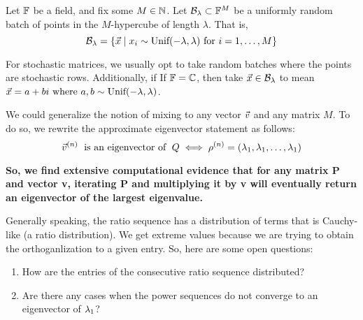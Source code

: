 \begin{definition}
Let $\F$ be a field, and fix some $M \in \N$. Let $\B_\lambda \subset \F^M$ be a uniformly random batch of points in the $M$-hypercube of length $\lambda$. That is,
$$\B_\lambda = \{\vec{x} \mid x_i \sim \text{Unif}(-\lambda, \lambda) \text{ for } i = \oneto[M]\}$$
\end{definition}

For stochastic matrices, we usually opt to take random batches where the points are stochastic rows.
Additionally, if If $\F = \mathbb{C}$, then take $\vec{x} \in \B_\lambda$ to mean $\vec{x} = a + bi \text{ where } a,b \sim \Unif(-\lambda,\lambda)$.


We could generalize the notion of mixing to any vector $\vvec$ and any matrix $M$.
To do so, we rewrite the approximate eigenvector statement as follows:
$$\vvecn{n} \text{\; is an eigenvector of \;} Q \iff \rvecn{n} = (\l_1, \l_1, \dots, \l_1)$$

\textbf{So, we find extensive computational evidence that for any matrix P and vector v, iterating P and multiplying it by v will eventually return an eigenvector of the largest eigenvalue.}

\newpage


Generally speaking, the ratio sequence has a distribution of terms that is Cauchy-like (a ratio distribution).
We get extreme values because we are trying to obtain the orthoganlization to a given entry. So, here are some open questions:

\begin{enumerate}
  \item How are the entries of the consecutive ratio sequence distributed?
  \item Are there any cases when the power sequences do not converge to an eigenvector of $\l_1$?
\end{enumerate}
